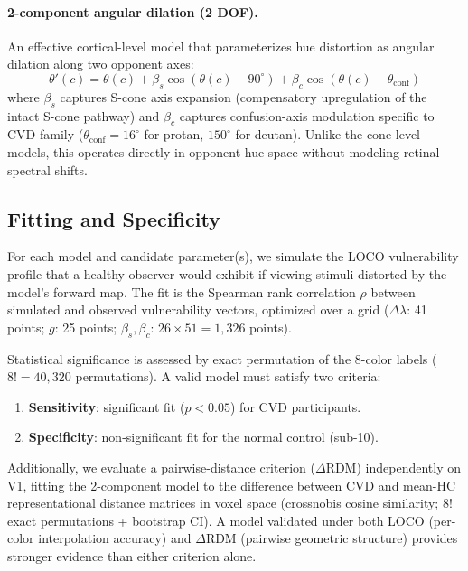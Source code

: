 \documentclass{article}
\begin{document}
\paragraph{2-component angular dilation (2 DOF).}
An effective cortical-level model that parameterizes hue distortion as angular dilation along two opponent axes:
\begin{equation}
\theta'(c) = \theta(c) + \beta_s \cos(\theta(c) {-} 90^\circ) + \beta_c \cos(\theta(c) {-} \theta_{\text{conf}})
\label{eq:2comp}
\end{equation}
where $\beta_s$ captures S-cone axis expansion (compensatory upregulation of the intact S-cone pathway) and $\beta_c$ captures confusion-axis modulation specific to CVD family ($\theta_{\text{conf}} = 16^\circ$ for protan, $150^\circ$ for deutan).
Unlike the cone-level models, this operates directly in opponent hue space without modeling retinal spectral shifts.

\subsection{Fitting and Specificity}

For each model and candidate parameter(s), we simulate the LOCO vulnerability profile that a healthy observer would exhibit if viewing stimuli distorted by the model's forward map.
The fit is the Spearman rank correlation $\rho$ between simulated and observed vulnerability vectors, optimized over a grid ($\Delta\lambda$: 41 points; $g$: 25 points; $\beta_s, \beta_c$: $26 \times 51 = 1{,}326$ points).

Statistical significance is assessed by exact permutation of the 8-color labels ($8! = 40{,}320$ permutations).
A valid model must satisfy two criteria:
\begin{enumerate}
    \item \textbf{Sensitivity}: significant fit ($p < 0.05$) for CVD participants.
    \item \textbf{Specificity}: non-significant fit for the normal control (sub-10).
\end{enumerate}

Additionally, we evaluate a pairwise-distance criterion ($\Delta$RDM) independently on V1, fitting the 2-component model to the difference between CVD and mean-HC representational distance matrices in voxel space (crossnobis cosine similarity; 8! exact permutations + bootstrap CI).
A model validated under both LOCO (per-color interpolation accuracy) and $\Delta$RDM (pairwise geometric structure) provides stronger evidence than either criterion alone.
\end{document}
